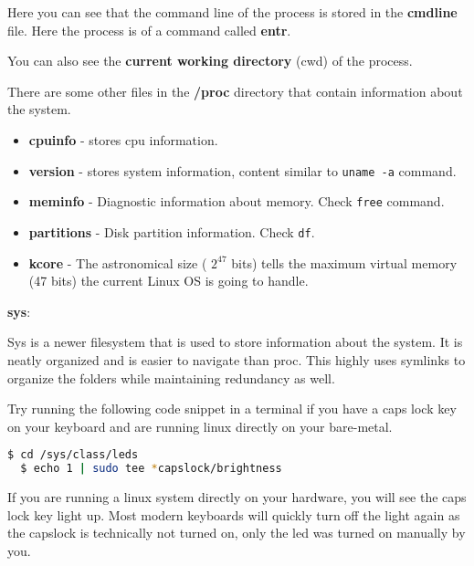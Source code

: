 Here you can see that the command line of the process is stored in the \textbf{cmdline} file.
Here the process is of a command called \textbf{entr}.

You can also see the \textbf{current working directory} (cwd) of the process.

There are some other files in the \textbf{/proc} directory that contain information about the system.

\begin{itemize}
  \item \textbf{cpuinfo} - stores cpu information.
  \item \textbf{version} - stores system information, content similar to \texttt{uname -a} command.
  \item \textbf{meminfo} - Diagnostic information about memory. Check \texttt{free} command.
  \item \textbf{partitions} - Disk partition information. Check \texttt{df}.
  \item \textbf{kcore} - The astronomical size ( $2^{47}$ bits) tells the maximum virtual memory (47 bits) the current Linux OS is going to handle.
\end{itemize}

\textbf{sys}:

Sys is a newer filesystem that is used to store information about the system.
It is neatly organized and is easier to navigate than proc.
This highly uses symlinks to organize the folders while maintaining redundancy as well.

Try running the following code snippet in a terminal if you have a caps lock key on your keyboard and are running linux directly on your bare-metal.

\begin{lstlisting}[language=bash]
  $ cd /sys/class/leds
  $ echo 1 | sudo tee *capslock/brightness
\end{lstlisting}

If you are running a linux system directly on your hardware, you will see the caps lock key light up.
Most modern keyboards will quickly turn off the light again as the capslock is technically not turned on, only the led was turned on manually by you.

